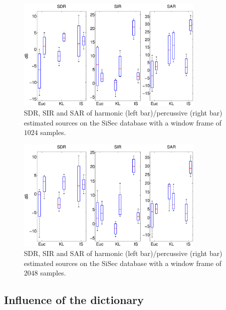 \begin{figure}[t]

  \centering 
  \includegraphics[width=9cm]{fig/NewDictDivTest1024}
  \caption{\label{frame1024} SDR, SIR and SAR of harmonic (left bar)/percussive (right bar) estimated sources on the SiSec database with a window frame of $1024$ samples.}
  
\end{figure}


\begin{figure}[t]

  \centering 
  \includegraphics[width=9cm]{fig/NewDictDivTest}
  \caption{\label{frame2048} SDR, SIR and SAR of harmonic (left bar)/percussive (right bar) estimated sources on the SiSec database with a window frame of $2048$ samples.}
  
\end{figure}



\subsection{Influence of the dictionary}
\label{setup:dictionary}

